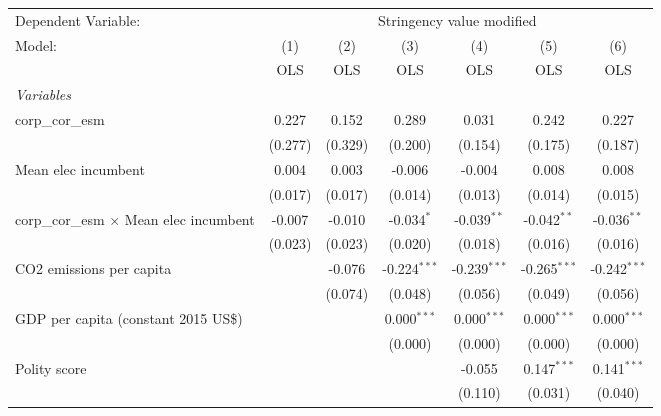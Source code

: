 
\begingroup
\centering
\begin{tabular}{lcccccc}
   \toprule
   Dependent Variable: & \multicolumn{6}{c}{Stringency value modified}\\
   Model:                                         & (1)     & (2)     & (3)            & (4)            & (5)            & (6)\\  
                                                  &  OLS    & OLS     & OLS            & OLS            & OLS            & OLS\\  
   \midrule
   \emph{Variables}\\
   corp\_cor\_esm                                 & 0.227   & 0.152   & 0.289          & 0.031          & 0.242          & 0.227\\   
                                                  & (0.277) & (0.329) & (0.200)        & (0.154)        & (0.175)        & (0.187)\\   
   Mean elec incumbent                            & 0.004   & 0.003   & -0.006         & -0.004         & 0.008          & 0.008\\   
                                                  & (0.017) & (0.017) & (0.014)        & (0.013)        & (0.014)        & (0.015)\\   
   corp\_cor\_esm $\times$ Mean elec incumbent    & -0.007  & -0.010  & -0.034$^{*}$   & -0.039$^{**}$  & -0.042$^{**}$  & -0.036$^{**}$\\   
                                                  & (0.023) & (0.023) & (0.020)        & (0.018)        & (0.016)        & (0.016)\\   
   CO2 emissions per capita                       &         & -0.076  & -0.224$^{***}$ & -0.239$^{***}$ & -0.265$^{***}$ & -0.242$^{***}$\\   
                                                  &         & (0.074) & (0.048)        & (0.056)        & (0.049)        & (0.056)\\   
   GDP per capita (constant 2015 US\$)            &         &         & 0.000$^{***}$  & 0.000$^{***}$  & 0.000$^{***}$  & 0.000$^{***}$\\   
                                                  &         &         & (0.000)        & (0.000)        & (0.000)        & (0.000)\\   
   Polity score                                   &         &         &                & -0.055         & 0.147$^{***}$  & 0.141$^{***}$\\   
                                                  &         &         &                & (0.110)        & (0.031)        & (0.040)\\   

\end{tabular}
